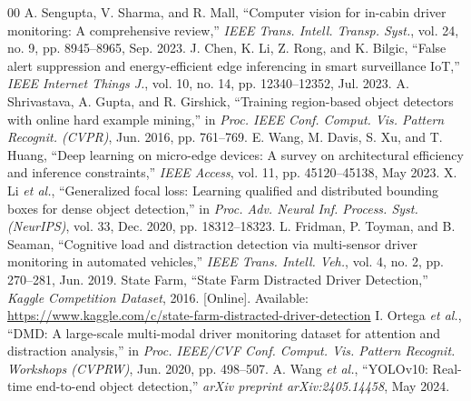 \documentclass[conference]{IEEEtran}
\begin{document}
\begin{thebibliography}{00}
A. Sengupta, V. Sharma, and R. Mall,
``Computer vision for in-cabin driver monitoring: A comprehensive review,''
\textit{IEEE Trans. Intell. Transp. Syst.}, vol. 24, no. 9, pp. 8945--8965, Sep. 2023.
J. Chen, K. Li, Z. Rong, and K. Bilgic,
``False alert suppression and energy-efficient edge inferencing in smart surveillance IoT,''
\textit{IEEE Internet Things J.}, vol. 10, no. 14, pp. 12340--12352, Jul. 2023.
A. Shrivastava, A. Gupta, and R. Girshick,
``Training region-based object detectors with online hard example mining,''
in \textit{Proc. IEEE Conf. Comput. Vis. Pattern Recognit. (CVPR)}, Jun. 2016, pp. 761--769.
E. Wang, M. Davis, S. Xu, and T. Huang,
``Deep learning on micro-edge devices: A survey on architectural efficiency and inference constraints,''
\textit{IEEE Access}, vol. 11, pp. 45120--45138, May 2023.
X. Li \textit{et al.},
``Generalized focal loss: Learning qualified and distributed bounding boxes for dense object detection,''
in \textit{Proc. Adv. Neural Inf. Process. Syst. (NeurIPS)}, vol. 33, Dec. 2020, pp. 18312--18323.
L. Fridman, P. Toyman, and B. Seaman,
``Cognitive load and distraction detection via multi-sensor driver monitoring in automated vehicles,''
\textit{IEEE Trans. Intell. Veh.}, vol. 4, no. 2, pp. 270--281, Jun. 2019.
State Farm,
``State Farm Distracted Driver Detection,''
\textit{Kaggle Competition Dataset}, 2016. [Online]. Available: \url{https://www.kaggle.com/c/state-farm-distracted-driver-detection}
I. Ortega \textit{et al.},
``DMD: A large-scale multi-modal driver monitoring dataset for attention and distraction analysis,''
in \textit{Proc. IEEE/CVF Conf. Comput. Vis. Pattern Recognit. Workshops (CVPRW)}, Jun. 2020, pp. 498--507.
A. Wang \textit{et al.},
``YOLOv10: Real-time end-to-end object detection,''
\textit{arXiv preprint arXiv:2405.14458}, May 2024.
\end{thebibliography}
\end{document}
